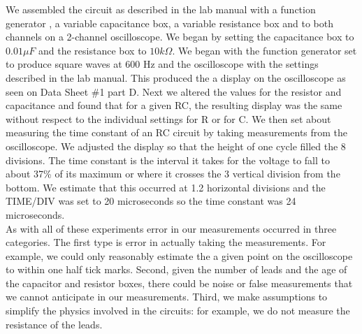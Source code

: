 
We assembled the circuit as described in the lab manual with a function generator , a variable capacitance box, a variable resistance box and to both channels on a 2-channel oscilloscope.   We began by setting the capacitance box to $0.01 \mu F$ and the resistance box to $10 k\Omega$.  We began with the function generator set to produce square waves at 600 Hz and the oscilloscope with the settings described in the lab manual.  This produced the a display on the oscilloscope as seen on Data Sheet \#1 part D.  Next we altered the values for the resistor and capacitance and found that for a given RC, the resulting display was the same without respect to the individual settings for R or for C.  We then set about measuring the time constant of an RC circuit by taking measurements from the oscilloscope.  We adjusted the display so that the height of one cycle filled the 8 divisions.  The time constant is the interval it takes for the voltage to fall to about 37\% of its maximum or where it crosses the 3 vertical division from the bottom.  We estimate that this occurred at 1.2 horizontal divisions and the TIME/DIV was set to 20 microseconds so the time constant was 24 microseconds.\\

As with all of these experiments error in our measurements occurred in three categories.  The first type is error in actually taking the measurements.  For example, we could only reasonably estimate the a given point on the oscilloscope to within one half tick marks.  Second, given the number of leads and the age of the capacitor and resistor boxes, there could be noise or false measurements that we cannot anticipate in our measurements.  Third, we make assumptions to simplify the physics involved in the circuits:  for example, we do not measure the resistance of the leads.\\